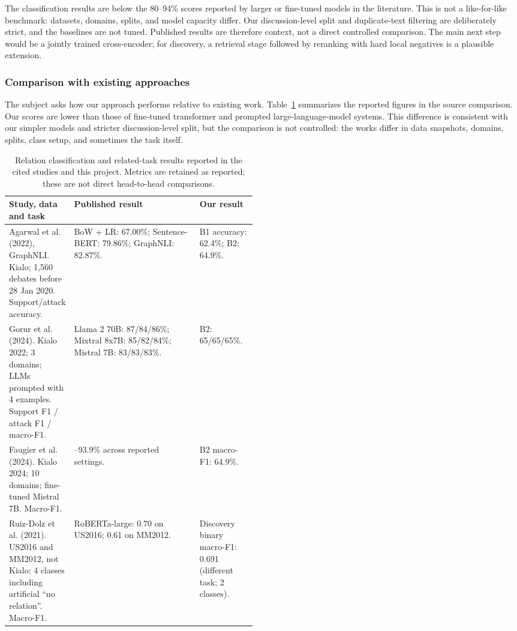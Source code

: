 \documentclass[11pt,a4paper]{article}
\begin{document}
The classification results are below the 80--94\% scores reported by larger or fine-tuned models in the literature. This is not a like-for-like benchmark: datasets, domains, splits, and model capacity differ. Our discussion-level split and duplicate-text filtering are deliberately strict, and the baselines are not tuned. Published results are therefore context, not a direct controlled comparison. The main next step would be a jointly trained cross-encoder; for discovery, a retrieval stage followed by reranking with hard local negatives is a plausible extension.

\subsubsection{Comparison with existing approaches}

The subject asks how our approach performs relative to existing work. Table~\ref{tab:literature} summarizes the reported figures in the source comparison. Our scores are lower than those of fine-tuned transformer and prompted large-language-model systems. This difference is consistent with our simpler models and stricter discussion-level split, but the comparison is not controlled: the works differ in data snapshots, domains, splits, class setup, and sometimes the task itself.

\begin{table}[H]
\centering
\small
\caption{Relation classification and related-task results reported in the cited studies and this project. Metrics are retained as reported; these are not direct head-to-head comparisons.}
\label{tab:literature}
\begin{tabularx}{\linewidth}{>{\raggedright\arraybackslash}p{0.25\linewidth}>{\raggedright\arraybackslash}X>{\raggedright\arraybackslash}p{0.23\linewidth}}
\toprule
Study, data and task & Published result & Our result \\
\midrule
Agarwal et al. (2022), GraphNLI. Kialo; 1,560 debates before 28 Jan 2020. Support/attack accuracy. & BoW + LR: 67.00\%; Sentence-BERT: 79.86\%; GraphNLI: 82.87\%. & B1 accuracy: 62.4\%; B2: 64.9\%. \\
Gorur et al. (2024). Kialo 2022; 3 domains; LLMs prompted with 4 examples. Support F1 / attack F1 / macro-F1. & Llama 2 70B: 87/84/86\%; Mixtral 8x7B: 85/82/84\%; Mistral 7B: 83/83/83\%. & B2: 65/65/65\%. \\
Faugier et al. (2024). Kialo 2024; 10 domains; fine-tuned Mistral 7B. Macro-F1. & 89.7--93.9\% across reported settings. & B2 macro-F1: 64.9\%. \\
Ruiz-Dolz et al. (2021). US2016 and MM2012, not Kialo; 4 classes including artificial ``no relation''. Macro-F1. & RoBERTa-large: 0.70 on US2016; 0.61 on MM2012. & Discovery binary macro-F1: 0.691 (different task; 2 classes). \\
\bottomrule
\end{tabularx}
\end{table}
\end{document}

